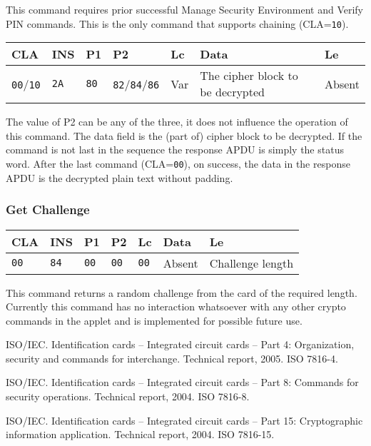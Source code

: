 \documentclass{article}
\begin{document}
This command requires prior successful Manage Security Environment and Verify PIN commands.
This is the only command that supports chaining (CLA=\texttt{10}).
\begin{flushleft}
\begin{tabular}{|l|l|l|l|l|l|l|}
\hline
CLA & INS & P1 & P2 & Lc & Data & Le \\
\hline
\texttt{00}/\texttt{10} & \texttt{2A} & \texttt{80} & \texttt{82}/\texttt{84}/\texttt{86} &
Var & The cipher block to be decrypted & Absent \\
\hline
\end{tabular}
\end{flushleft}
The value of P2 can be any of the three, it does not influence the operation of this command.
The data field is the (part of) cipher block to be decrypted.
If the command is not last in the sequence the response APDU is simply the status word.
After the last command (CLA=\texttt{00}), on success,
the data in the response APDU is the decrypted plain text without padding.

\subsubsection{Get Challenge}

\begin{flushleft}
\begin{tabular}{|l|l|l|l|l|l|l|}
\hline
CLA & INS & P1 & P2 & Lc & Data & Le \\
\hline
\texttt{00} & \texttt{84} & \texttt{00} & \texttt{00} &
\texttt{00} & Absent & Challenge length \\
\hline
\end{tabular}
\end{flushleft}
This command returns a random challenge from the card of the required length. Currently this command
has no interaction whatsoever with any other crypto commands in the applet and is implemented for 
possible future use.

\begin{thebibliography}{1}
 ISO/IEC.  \newblock Identification cards -- Integrated circuit cards --
  Part 4: Organization, security and commands for interchange.  \newblock Technical report,
  2005.  \newblock ISO 7816-4.

 ISO/IEC.  \newblock Identification cards -- Integrated circuit cards --
  Part 8: Commands for security operations.  \newblock Technical report,
  2004.  \newblock ISO 7816-8.

 ISO/IEC.  \newblock Identification cards -- Integrated circuit cards --
  Part 15: Cryptographic information application. \newblock Technical report,
  2004.  \newblock ISO 7816-15.


\end{thebibliography}
\end{document}

